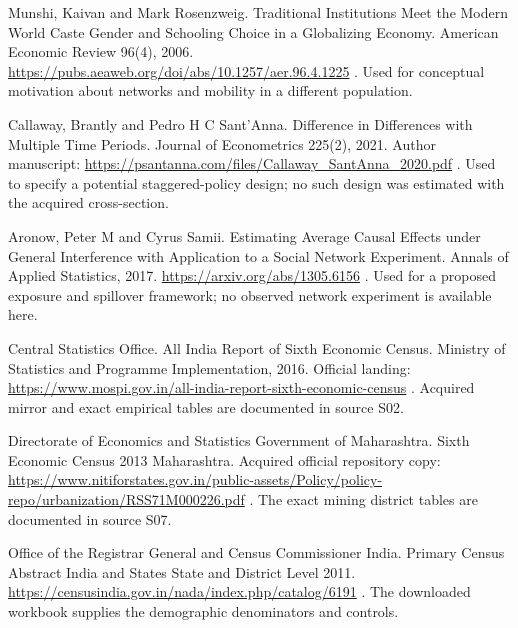 \documentclass[11pt,a4paper]{report}
\begin{document}
Munshi, Kaivan and Mark Rosenzweig. Traditional Institutions Meet the Modern World Caste Gender and Schooling Choice in a Globalizing Economy. American Economic Review 96(4), 2006. \url{https://pubs.aeaweb.org/doi/abs/10.1257/aer.96.4.1225} . Used for conceptual motivation about networks and mobility in a different population.

Callaway, Brantly and Pedro H C Sant'Anna. Difference in Differences with Multiple Time Periods. Journal of Econometrics 225(2), 2021. Author manuscript: \url{https://psantanna.com/files/Callaway_SantAnna_2020.pdf} . Used to specify a potential staggered-policy design; no such design was estimated with the acquired cross-section.

Aronow, Peter M and Cyrus Samii. Estimating Average Causal Effects under General Interference with Application to a Social Network Experiment. Annals of Applied Statistics, 2017. \url{https://arxiv.org/abs/1305.6156} . Used for a proposed exposure and spillover framework; no observed network experiment is available here.

Central Statistics Office. All India Report of Sixth Economic Census. Ministry of Statistics and Programme Implementation, 2016. Official landing: \url{https://www.mospi.gov.in/all-india-report-sixth-economic-census} . Acquired mirror and exact empirical tables are documented in source S02.

Directorate of Economics and Statistics Government of Maharashtra. Sixth Economic Census 2013 Maharashtra. Acquired official repository copy: \url{https://www.nitiforstates.gov.in/public-assets/Policy/policy-repo/urbanization/RSS71M000226.pdf} . The exact mining district tables are documented in source S07.

Office of the Registrar General and Census Commissioner India. Primary Census Abstract India and States State and District Level 2011. \url{https://censusindia.gov.in/nada/index.php/catalog/6191} . The downloaded workbook supplies the demographic denominators and controls.
\end{document}
